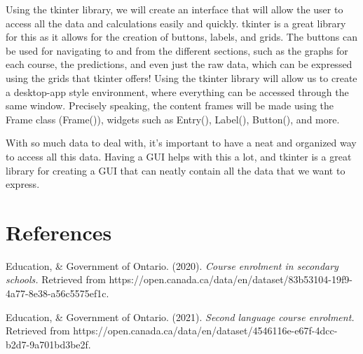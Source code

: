 \documentclass[fontsize=11pt]{article}
\begin{document}
Using the tkinter library, we will create an interface that will allow the user to access all the data and calculations easily and quickly. tkinter is a great library for this as it allows for the creation of buttons, labels, and grids. The buttons can be used for navigating to and from the different sections, such as the graphs for each course, the predictions, and even just the raw data, which can be expressed using the grids that tkinter offers! Using the tkinter library will allow us to create a desktop-app style environment, where everything can be accessed through the same window. Precisely speaking, the content frames will be made using the Frame class (Frame()), widgets such as Entry(), Label(), Button(), and more.

With so much data to deal with, it’s important to have a neat and organized way to access all this data. Having a GUI helps with this a lot, and tkinter is a great library for creating a GUI that can neatly contain all the data that we want to express.


\section*{References}

Education, \& Government of Ontario. (2020). \emph{Course enrolment in secondary schools.} Retrieved from \linebreak https://open.canada.ca/data/en/dataset/83b53104-19f9-4a77-8e38-a56c5575ef1c.

Education, \& Government of Ontario. (2021). \emph{Second language course enrolment.} Retrieved from \linebreak https://open.canada.ca/data/en/dataset/4546116e-e67f-4dcc-b2d7-9a701bd3be2f. 


\end{document}
